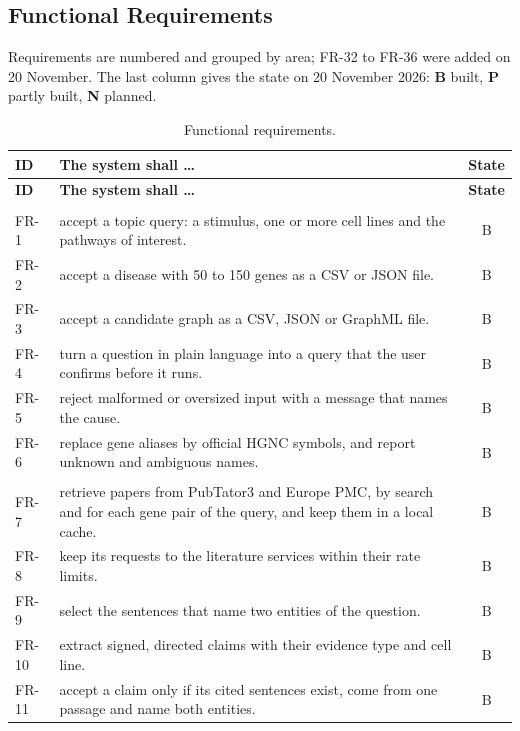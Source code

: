 \documentclass[11pt,a4paper]{article}
\begin{document}
\subsection{Functional Requirements}\label{sec:fr}

Requirements are numbered and grouped by area; FR-32 to FR-36 were added on 20 November. The
last column gives the state on 20 November 2026: \textbf{B} built, \textbf{P} partly built,
\textbf{N} planned.

{\small
\begin{longtable}{@{}p{1.2cm}p{12.6cm}c@{}}
\toprule
\textbf{ID} & \textbf{The system shall \dots} & \textbf{State}\\
\midrule
\endfirsthead
\toprule
\textbf{ID} & \textbf{The system shall \dots} & \textbf{State}\\
\midrule
\endhead
\bottomrule
\caption{Functional requirements.}\label{tab:fr}
\endlastfoot
\addlinespace
\multicolumn{3}{@{}l}{\textbf{Query input}}\\
FR-1 & accept a topic query: a stimulus, one or more cell lines and the pathways of interest. & B\\
FR-2 & accept a disease with 50 to 150 genes as a CSV or JSON file. & B\\
FR-3 & accept a candidate graph as a CSV, JSON or GraphML file. & B\\
FR-4 & turn a question in plain language into a query that the user confirms before it runs. & B\\
FR-5 & reject malformed or oversized input with a message that names the cause. & B\\
FR-6 & replace gene aliases by official HGNC symbols, and report unknown and ambiguous names. & B\\
\addlinespace
\multicolumn{3}{@{}l}{\textbf{Retrieval and reading}}\\
FR-7 & retrieve papers from PubTator3 and Europe PMC, by search and for each gene pair of the
  query, and keep them in a local cache. & B\\
FR-8 & keep its requests to the literature services within their rate limits. & B\\
FR-9 & select the sentences that name two entities of the question. & B\\
FR-10 & extract signed, directed claims with their evidence type and cell line. & B\\
FR-11 & accept a claim only if its cited sentences exist, come from one passage and name both entities. & B\\

\end{longtable}}
\end{document}
